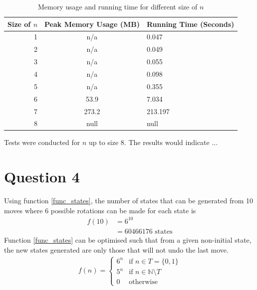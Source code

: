 \documentclass[]{article}
\begin{document}
\begin{table}[H]
\begin{center}
	\begin{tabular}{|r|c|l|}
		\hline
		Size of \(n\)&Peak Memory Usage (MB)&Running Time (Seconds)\\
		\hline
		1&n/a&0.047\\
		2&n/a&0.049\\
		3&n/a&0.055\\
		4&n/a&0.098\\
		5&n/a&0.355\\
		6&53.9&7.034\\
		7&273.2&213.197\\
		8&null&null\\
		\hline
		
	\end{tabular}\caption{Memory usage and running time for different size of \(n\)}\end{center}
	\label{table:mem_usage}
\end{table}

Tests were conducted for \(n\) up to size 8. The results would indicate ...

\section*{Question 4}
Using function \ref{func_states}, the number of states that can be generated from 10 moves where 6 possible rotations can be made for each state is
\begin{equation*}
\begin{split}
  f(10) & = 6^{10} \\
		  & = 60466176\text{ states}
\end{split}
\end{equation*}								
Function \ref{func_states} can be optimised such that from a given non-initial state, the new states generated are only those that will not undo the last move.
\begin{equation}
\begin{split}
f(n) =
\begin{cases}
	6^{n} & \text{if }n \in T = \{0, 1\}\\
	5^{n} & \text{if }n \in \mathbb{N} \setminus T\\
	0 & \text{otherwise}
\end{cases}
\end{split}
\end{equation}	
\end{document}
